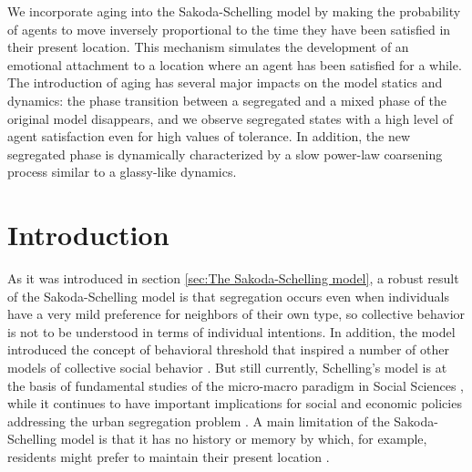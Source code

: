 
We incorporate aging into the Sakoda-Schelling model by making the probability of agents to move inversely proportional to the time they have been satisfied in their present location. This mechanism simulates the development of an emotional attachment to a location where an agent has been satisfied for a while. The introduction of aging has several major impacts on the model statics and dynamics: the phase transition between a segregated and a mixed phase of the original model disappears, and we observe segregated states with a high level of agent satisfaction even for high values of tolerance. In addition, the new segregated phase is dynamically characterized by a slow power-law coarsening process similar to a glassy-like dynamics.

\section{Introduction}

As it was introduced in section \ref{sec:The Sakoda-Schelling model}, a robust result of the Sakoda-Schelling model is that segregation occurs even when individuals have a very mild preference for neighbors of their own type, so collective behavior is not to be understood in terms of individual intentions. In addition, the model introduced the concept of behavioral threshold that inspired a number of other models of collective social behavior \cite{granovetter}. But still currently, Schelling's model is at the basis of fundamental studies of the micro-macro paradigm  in Social Sciences \cite{grauwin-2009}, while it continues to have important implications for social and economic policies addressing the urban segregation problem \cite{clark-1991,Sassen,Clark,lamanna-2018}. A main limitation of the Sakoda-Schelling model is that it has no history or memory by which, for example, residents might prefer to maintain their present location \cite{silver-2021}.

